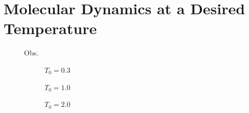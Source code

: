 \section{Molecular Dynamics at a Desired Temperature}

\begin{figure}[ht]

Obs.
\hfill
\begin{subfigure}{0.3\textwidth}
\centering
$T_0 = 0.3$
\end{subfigure}
\hfill
\begin{subfigure}{0.3\textwidth}
\centering
$T_0 = 1.0$
\end{subfigure}
\hfill
\begin{subfigure}{0.3\textwidth}
\centering
$T_0 = 2.0$
\end{subfigure}


\end{figure}
